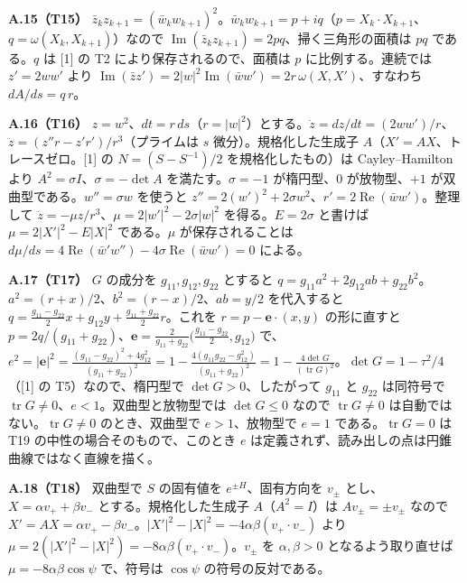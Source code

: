 \documentclass[
  a4paper,
]{ltjsarticle}
\begin{document}
\textbf{A.15（T15）}
\(\bar z_kz_{k+1}=(\bar w_kw_{k+1})^2\)。\(\bar w_kw_{k+1}=p+iq\)（\(p=X_k\cdot X_{k+1}\)、\(q=\omega(X_k,X_{k+1})\)）なので
\(\operatorname{Im}(\bar z_kz_{k+1})=2pq\)、掃く三角形の面積は \(pq\)
である。\(q\) は {[}1{]} の T2 により保存されるので、面積は \(p\)
に比例する。連続では \(z'=2ww'\) より
\(\operatorname{Im}(\bar zz')=2\lvert w\rvert^2\operatorname{Im}(\bar ww')=2r\,\omega(X,X')\)、すなわち
\(dA/ds=q\,r\)。

\textbf{A.16（T16）}
\(z=w^2\)、\(dt=r\,ds\)（\(r=\lvert w\rvert^2\)）とする。\(\dot z=dz/dt=(2ww')/r\)、\(\ddot z=(z''r-z'r')/r^3\)（プライムは
\(s\) 微分）。規格化した生成子 \(A\)（\(X'=AX\)、トレースゼロ。{[}1{]}
の \(N=(S-S^{-1})/2\) を規格化したもの）は Cayley--Hamilton より
\(A^2=\sigma I\)、\(\sigma=-\det A\) を満たす。\(\sigma=-1\)
が楕円型、\(0\) が放物型、\(+1\) が双曲型である。\(w''=\sigma w\)
を使うと
\(z''=2(w')^2+2\sigma w^2\)、\(r'=2\operatorname{Re}(\bar ww')\)。整理して
\(\ddot z=-\mu z/r^3\)、\(\mu=2\lvert w'\rvert^2-2\sigma\lvert w\rvert^2\)
を得る。\(E=2\sigma\) と書けば
\(\mu=2\lvert X'\rvert^2-E\lvert X\rvert^2\) である。\(\mu\)
が保存されることは
\(d\mu/ds=4\operatorname{Re}(\bar w'w'')-4\sigma\operatorname{Re}(\bar ww')=0\)
による。

\textbf{A.17（T17）} \(G\) の成分を \(g_{11},g_{12},g_{22}\) とすると
\(q=g_{11}a^2+2g_{12}ab+g_{22}b^2\)。\(a^2=(r+x)/2\)、\(b^2=(r-x)/2\)、\(ab=y/2\)
を代入すると
\(q=\frac{g_{11}-g_{22}}{2}x+g_{12}y+\frac{g_{11}+g_{22}}{2}r\)。これを
\(r=p-\mathbf e\cdot(x,y)\) の形に直すと
\(p=2q/(g_{11}+g_{22})\)、\(\mathbf e=\frac{2}{g_{11}+g_{22}}\bigl(\frac{g_{11}-g_{22}}{2},g_{12}\bigr)\)
で、\(e^2=\lvert\mathbf e\rvert^2=\frac{(g_{11}-g_{22})^2+4g_{12}^2}{(g_{11}+g_{22})^2}=1-\frac{4(g_{11}g_{22}-g_{12}^2)}{(g_{11}+g_{22})^2}=1-\frac{4\det G}{(\operatorname{tr}G)^2}\)。\(\det G=1-\tau^2/4\)（{[}1{]}
の T5）なので、楕円型で \(\det G>0\)、したがって \(g_{11}\) と
\(g_{22}\) は同符号で
\(\operatorname{tr}G\neq0\)、\(e<1\)。双曲型と放物型では \(\det G\le0\)
なので \(\operatorname{tr}G\neq0\)
は自動ではない。\(\operatorname{tr}G\neq0\) のとき、双曲型で
\(e>1\)、放物型で \(e=1\) である。\(\operatorname{tr}G=0\) は T19
の中性の場合そのもので、このとき \(e\)
は定義されず、読み出しの点は円錐曲線ではなく直線を描く。

\textbf{A.18（T18）} 双曲型で \(S\) の固有値を \(e^{\pm H}\)、固有方向を
\(v_\pm\) とし、\(X=\alpha v_++\beta v_-\) とする。規格化した生成子
\(A\)（\(A^2=I\)）は \(Av_\pm=\pm v_\pm\) なので
\(X'=AX=\alpha v_+-\beta v_-\)。\(\lvert X'\rvert^2-\lvert X\rvert^2=-4\alpha\beta(v_+\!\cdot v_-)\)
より
\(\mu=2(\lvert X'\rvert^2-\lvert X\rvert^2)=-8\alpha\beta(v_+\!\cdot v_-)\)。\(v_\pm\)
を \(\alpha,\beta>0\) となるよう取り直せば \(\mu=-8\alpha\beta\cos\psi\)
で、符号は \(\cos\psi\) の符号の反対である。
\end{document}

